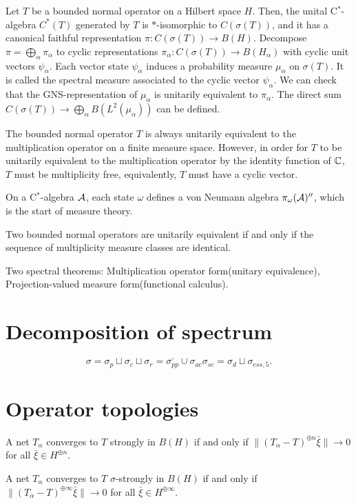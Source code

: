 \documentclass{../../large}
\begin{document}
\begin{prb}
Let $T$ be a bounded normal operator on a Hilbert space $H$.
Then, the unital C$^*$-algebra $C^*(T)$ generated by $T$ is $*$-isomorphic to $C(\sigma(T))$, and it has a canonical faithful representation $\pi:C(\sigma(T))\to B(H)$.
Decompose $\pi=\bigoplus_\alpha\pi_\alpha$ to cyclic representations $\pi_\alpha:C(\sigma(T))\to B(H_\alpha)$ with cyclic unit vectors $\psi_\alpha$.
Each vector state $\psi_\alpha$ induces a probability measure $\mu_\alpha$ on $\sigma(T)$.
It is called the spectral measure associated to the cyclic vector $\psi_\alpha$.
We can check that the GNS-representation of $\mu_\alpha$ is unitarily equivalent to $\pi_\alpha$.
The direct sum $C(\sigma(T))\to\bigoplus_\alpha B(L^2(\mu_\alpha))$ can be defined.

The bounded normal operator $T$ is always unitarily equivalent to the multiplication operator on a finite measure space.
However, in order for $T$ to be unitarily equivalent to the multiplication operator by the identity function of $\mathbb{C}$, $T$ must be multiplicity free, equivalently, $T$ must have a cyclic vector.
\end{prb}

On a C$^*$-algebra $\mathcal{A}$, each state $\omega$ defines a von Neumann algebra $\pi_\omega(\mathcal{A})''$, which is the start of measure theory.

Two bounded normal operators are unitarily equivalent if and only if the sequence of multiplicity measure classes are identical.

Two spectral theorems: Multiplication operator form(unitary equivalence), Projection-valued measure form(functional calculus).


\section{Decomposition of spectrum}
\[\sigma=\sigma_p\sqcup\sigma_c\sqcup\sigma_r=\bar{\sigma_{pp}}\cup\sigma_{ac}\sigma_{sc}=\sigma_d\sqcup\sigma_{ess,5}.\]


\section{Operator topologies}

\begin{prb}
\begin{parts}
\item
A net $T_\alpha$ converges to $T$ strongly in $B(H)$ if and only if $\|(T_\alpha-T)^{\oplus n}\bar\xi\|\to0$ for all $\bar\xi\in H^{\oplus n}$.
\item
A net $T_\alpha$ converges to $T$ $\sigma$-strongly in $B(H)$ if and only if $\|(T_\alpha-T)^{\oplus\infty}\bar\xi\|\to0$ for all $\bar\xi\in H^{\oplus\infty}$.
\end{parts}
\end{prb}
\end{document}
